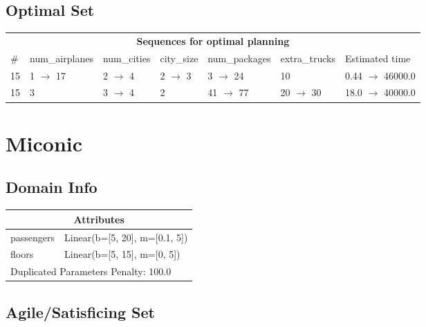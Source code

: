 \documentclass{article}
\begin{document}
                            \subsection*{Optimal Set}

                            \begin{center}
                            \begin{tabular}{l|l|l|l|l|l|l}
                            \multicolumn{7}{c}{\bf \large Sequences for optimal planning}\\
                            \# & num\_airplanes & num\_cities & city\_size & num\_packages & extra\_trucks & Estimated time\\\midrule
                            15&1 $\rightarrow$ 17&2 $\rightarrow$ 4&2 $\rightarrow$ 3&3 $\rightarrow$ 24&10&0.44 $\rightarrow$ 46000.0\\
15&3&3 $\rightarrow$ 4&2&41 $\rightarrow$ 77&20 $\rightarrow$ 30&18.0 $\rightarrow$ 40000.0
                            \end{tabular}
                            \end{center}
                    \newpage \section{Miconic}
                    \subsection*{Domain Info}

                    \begin{center}
                    \begin{tabular}{p{}p{}}
                    \multicolumn{2}{c}{\bf \large Attributes}\\\midrule
                    passengers & Linear(b=[5, 20], m=[0.1, 5])\\
floors & Linear(b=[5, 15], m=[0, 5])
                    
                     \\\midrule
                    \multicolumn{2}{l}{Duplicated Parameters Penalty: 100.0}
                    \end{tabular}
                    \end{center}
                
                         \subsection*{Agile/Satisficing Set}
\end{document}
